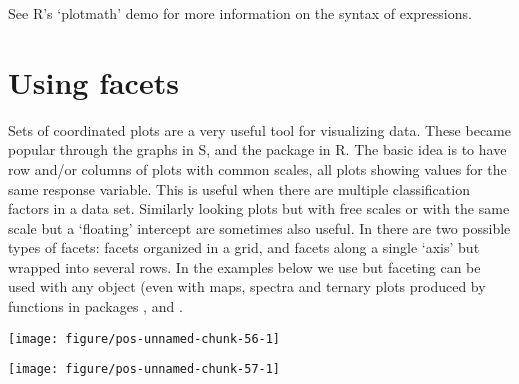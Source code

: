 \documentclass[paper=a4,10pt,div=17,headsepline,BCOR=12mm,twoside,open=right]{scrbook}\usepackage{knitr}
\begin{document}
See R's `plotmath' demo for more information on the syntax of expressions.

\section{Using facets}

Sets of coordinated plots are a very useful tool for visualizing data. These became popular through the  graphs in S, and the  package in R. The basic idea is to have row and/or columns of plots with common scales, all plots showing values for the same response variable. This is useful when there are multiple classification factors in a data set. Similarly looking plots but with free scales or with the same scale but a `floating' intercept are sometimes also useful. In \ggplot there are two possible types of facets: facets organized in a grid, and facets along a single `axis' but wrapped into several rows. In the examples below we use  but faceting can be used with any  object (even with maps, spectra and ternary plots produced by functions in packages \ggmap, \ggspectra and \ggtern.



\begin{knitrout}\footnotesize
{}\color{fgcolor}\begin{kframe}
\begin{alltt}
 \hlkwb{<-} \hlstd{(}   \hlopt{+} \hlstd{()}
 \hlopt{+}  \hlopt{~} 
\end{alltt}
\end{kframe}

{\centering \texttt{[image: figure/pos-unnamed-chunk-56-1]} 

}



\end{knitrout}

\begin{knitrout}\footnotesize
{}\color{fgcolor}\begin{kframe}
\begin{alltt}
 \hlopt{+}  \hlopt{~} 
\end{alltt}
\end{kframe}

{\centering \texttt{[image: figure/pos-unnamed-chunk-57-1]} 

}



\end{knitrout}
\end{document}
